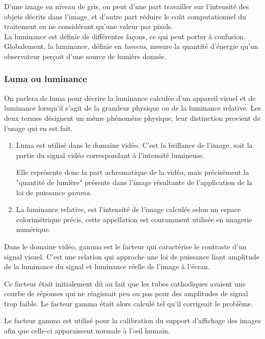 \documentclass[a4paper,12pt]{report}
\begin{document}
D'une image en niveau de gris, on peut d'une part travailler sur l'intensité des objets décrits dans l'image, et d'autre part réduire le coût computationnel du traitement en ne considérant qu'une valeur par pixels.\\

La luminance est définie de différentes façons, ce qui peut porter à confusion. Globalement, la luminance, définie en \textit{lumens}, mesure la quantité d'énergie qu'un observateur perçoit d'une source de lumière donnée.  
\subsubsection{Luma ou luminance}
On parlera de luma pour décrire la luminance calculée d'un appareil visuel et de luminance lorsqu'il s'agit de la grandeur physique ou de la luminance relative.
Les deux termes désignent un même phénomène physique, leur distinction provient de l'usage qui en est fait.
 
\begin{enumerate}
\item Luma est utilisé dans le domaine vidéo. C'est la brillance de l'image, soit la partie du signal vidéo correspondant à l'intensité lumineuse.  

Elle représente donc la part achromatique de la vidéo, mais précisément la "quantité de lumière" présente dans l'image résultante de l'application de la loi de puissance \textit{gamma}.\\

\item La luminance relative, est l'intensité de l'image calculée selon un espace colorimétrique précis, cette appellation est couramment utilisée en imagerie numérique.\\
\end{enumerate}

Dans le domaine vidéo, gamma est le facteur qui caractérise le contraste d'un signal visuel. C'est une relation qui approche une loi de puissance liant amplitude de la luminance du signal et luminance réelle de l'image à l'écran. 

Ce facteur était initialement dû au fait que les tubes cathodiques avaient une courbe de réponses qui ne réagissait peu ou pas pour des amplitudes de signal trop faible. Le facteur gamma était alors calculé tel qu'il corrigeait le problème. 

Le facteur gamma est utilisé pour la calibration du support d'affichage des images afin que celle-ci apparaissent normale à l'œil humain.\\
\end{document}

